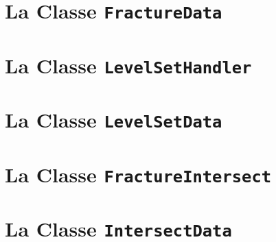 \section{La Classe \texttt{FractureData}}

\section{La Classe \texttt{LevelSetHandler}}

\section{La Classe \texttt{LevelSetData}}


\section{La Classe \texttt{FractureIntersect}}

\section{La Classe \texttt{IntersectData}}

